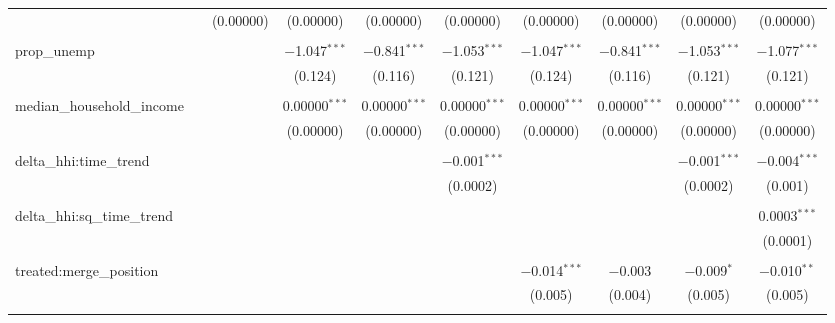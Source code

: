 \begin{table}[H]
{\begin{tabular}{@{\extracolsep{5pt}}lccccccccc}
   &  & (0.00000) & (0.00000) & (0.00000) & (0.00000) & (0.00000) & (0.00000) & (0.00000) & (0.00000) \\  

   & & & & & & & & & \\  

  prop\_unemp &  &  & $-$1.047$^{***}$ & $-$0.841$^{***}$ & $-$1.053$^{***}$ & $-$1.047$^{***}$ & $-$0.841$^{***}$ & $-$1.053$^{***}$ & $-$1.077$^{***}$ \\  

   &  &  & (0.124) & (0.116) & (0.121) & (0.124) & (0.116) & (0.121) & (0.121) \\  

   & & & & & & & & & \\  

  median\_household\_income &  &  & 0.00000$^{***}$ & 0.00000$^{***}$ & 0.00000$^{***}$ & 0.00000$^{***}$ & 0.00000$^{***}$ & 0.00000$^{***}$ & 0.00000$^{***}$ \\  

   &  &  & (0.00000) & (0.00000) & (0.00000) & (0.00000) & (0.00000) & (0.00000) & (0.00000) \\  

   & & & & & & & & & \\  

  delta\_hhi:time\_trend &  &  &  &  & $-$0.001$^{***}$ &  &  & $-$0.001$^{***}$ & $-$0.004$^{***}$ \\  

   &  &  &  &  & (0.0002) &  &  & (0.0002) & (0.001) \\  

   & & & & & & & & & \\  

  delta\_hhi:sq\_time\_trend &  &  &  &  &  &  &  &  & 0.0003$^{***}$ \\  

   &  &  &  &  &  &  &  &  & (0.0001) \\  

   & & & & & & & & & \\  

  treated:merge\_position &  &  &  &  &  & $-$0.014$^{***}$ & $-$0.003 & $-$0.009$^{*}$ & $-$0.010$^{**}$ \\  

   &  &  &  &  &  & (0.005) & (0.004) & (0.005) & (0.005) \\  

   & & & & & & & & & \\  


\end{tabular}}
\end{table}
